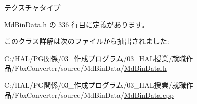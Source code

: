 テクスチャタイプ 



 Md\+Bin\+Data.\+h の 336 行目に定義があります。



このクラス詳解は次のファイルから抽出されました\+:\begin{DoxyCompactItemize}
\item 
C\+:/\+H\+A\+L/\+P\+G関係/03\+\_\+作成プログラム/03\+\_\+\+H\+A\+L授業/就職作品/\+Fbx\+Converter/source/\+Md\+Bin\+Data/\mbox{\hyperlink{_md_bin_data_8h}{Md\+Bin\+Data.\+h}}\item 
C\+:/\+H\+A\+L/\+P\+G関係/03\+\_\+作成プログラム/03\+\_\+\+H\+A\+L授業/就職作品/\+Fbx\+Converter/source/\+Md\+Bin\+Data/\mbox{\hyperlink{_md_bin_data_8cpp}{Md\+Bin\+Data.\+cpp}}\end{DoxyCompactItemize}

